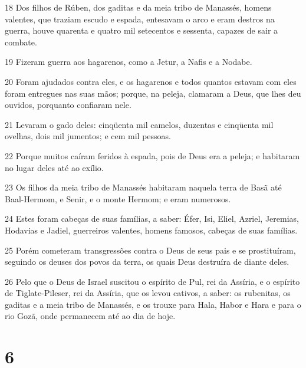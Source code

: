 \par 18 Dos filhos de Rúben, dos gaditas e da meia tribo de Manassés, homens valentes, que traziam escudo e espada, entesavam o arco e eram destros na guerra, houve quarenta e quatro mil setecentos e sessenta, capazes de sair a combate.
\par 19 Fizeram guerra aos hagarenos, como a Jetur, a Nafis e a Nodabe.
\par 20 Foram ajudados contra eles, e os hagarenos e todos quantos estavam com eles foram entregues nas suas mãos; porque, na peleja, clamaram a Deus, que lhes deu ouvidos, porquanto confiaram nele.
\par 21 Levaram o gado deles: cinqüenta mil camelos, duzentas e cinqüenta mil ovelhas, dois mil jumentos; e cem mil pessoas.
\par 22 Porque muitos caíram feridos à espada, pois de Deus era a peleja; e habitaram no lugar deles até ao exílio.
\par 23 Os filhos da meia tribo de Manassés habitaram naquela terra de Basã até Baal-Hermom, e Senir, e o monte Hermom; e eram numerosos.
\par 24 Estes foram cabeças de suas famílias, a saber: Éfer, Isi, Eliel, Azriel, Jeremias, Hodavias e Jadiel, guerreiros valentes, homens famosos, cabeças de suas famílias.
\par 25 Porém cometeram transgressões contra o Deus de seus pais e se prostituíram, seguindo os deuses dos povos da terra, os quais Deus destruíra de diante deles.
\par 26 Pelo que o Deus de Israel suscitou o espírito de Pul, rei da Assíria, e o espírito de Tiglate-Pileser, rei da Assíria, que os levou cativos, a saber: os rubenitas, os gaditas e a meia tribo de Manassés, e os trouxe para Hala, Habor e Hara e para o rio Gozã, onde permanecem até ao dia de hoje.

\chapter{6}

